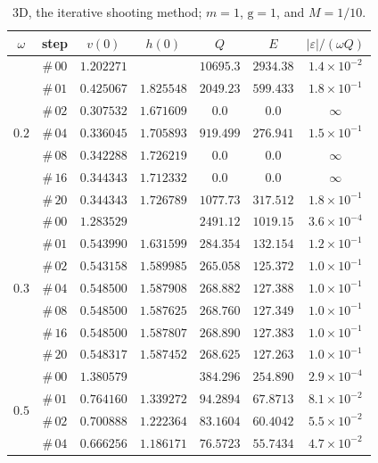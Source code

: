 \documentclass[12pt]{extarticle}
\newcommand{\coupling}{\mathrm{g}}
\theoremstyle{plain}
\theoremstyle{remark}
\begin{document}
\begin{table}[!ht]
\begin{center}
\caption{\footnotesize
3D, the iterative shooting method; $m=1$, $\coupling=1$, and $M=1/10$.
}
\begin{tabular}{ccccccc} \toprule
$\omega$ & step & $v(0)$ & $h(0)$ & $Q$ & $E$ & $|\varepsilon|/(\omega Q)$\\
\midrule
\multirow{7}{*}{$0.2$} & $\#\,00$ & $1.202271$ &  & $10695.3$ & $2934.38$ & $1.4\times10^{-2}$ \\
 & $\#\,01$ & $0.425067$ & $1.825548$ & $2049.23$ & $599.433$ & $1.8\times10^{-1}$ \\
 & $\#\,02$ & $0.307532$ & $1.671609$ & $0.0$ & $0.0$ & $\infty$ \\
 & $\#\,04$ & $0.336045$ & $1.705893$ & $919.499$ & $276.941$ & $1.5\times10^{-1}$ \\
 & $\#\,08$ & $0.342288$ & $1.726219$ & $0.0$ & $0.0$ & $\infty$ \\
 & $\#\,16$ & $0.344343$ & $1.712332$ & $0.0$ & $0.0$ & $\infty$ \\
 & $\#\,20$ & $0.344343$ & $1.726789$ & $1077.73$ & $317.512$ & $1.8\times10^{-1}$ \\
\midrule
\multirow{7}{*}{$0.3$} & $\#\,00$ & $1.283529$ &  & $2491.12$ & $1019.15$ & $3.6\times10^{-4}$ \\
 & $\#\,01$ & $0.543990$ & $1.631599$ & $284.354$ & $132.154$ & $1.2\times10^{-1}$ \\
 & $\#\,02$ & $0.543158$ & $1.589985$ & $265.058$ & $125.372$ & $1.0\times10^{-1}$ \\
 & $\#\,04$ & $0.548500$ & $1.587908$ & $268.882$ & $127.388$ & $1.0\times10^{-1}$ \\
 & $\#\,08$ & $0.548500$ & $1.587625$ & $268.760$ & $127.349$ & $1.0\times10^{-1}$ \\
 & $\#\,16$ & $0.548500$ & $1.587807$ & $268.890$ & $127.383$ & $1.0\times10^{-1}$ \\
 & $\#\,20$ & $0.548317$ & $1.587452$ & $268.625$ & $127.263$ & $1.0\times10^{-1}$ \\
\midrule
\multirow{7}{*}{$0.5$} & $\#\,00$ & $1.380579$ &  & $384.296$ & $254.890$ & $2.9\times10^{-4}$ \\
 & $\#\,01$ & $0.764160$ & $1.339272$ & $94.2894$ & $67.8713$ & $8.1\times10^{-2}$ \\
 & $\#\,02$ & $0.700888$ & $1.222364$ & $83.1604$ & $60.4042$ & $5.5\times10^{-2}$ \\
 & $\#\,04$ & $0.666256$ & $1.186171$ & $76.5723$ & $55.7434$ & $4.7\times10^{-2}$ \\

\end{tabular}
\end{center}
\end{table}
\end{document}
